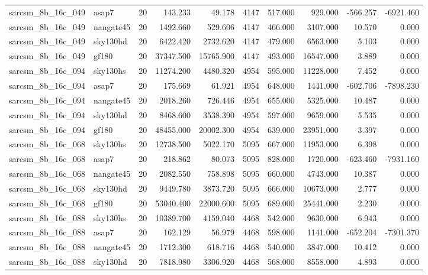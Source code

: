 \begin{tabular}{llrrrrrrrr}
sarcsm\_8b\_16c\_049 & asap7 & 20 & 143.233 & 49.178 & 4147 & 517.000 & 929.000 & -566.257 & -6921.460 \\
sarcsm\_8b\_16c\_049 & nangate45 & 20 & 1492.660 & 529.606 & 4147 & 466.000 & 3107.000 & 10.570 & 0.000 \\
sarcsm\_8b\_16c\_049 & sky130hd & 20 & 6422.420 & 2732.620 & 4147 & 479.000 & 6563.000 & 5.103 & 0.000 \\
sarcsm\_8b\_16c\_049 & gf180 & 20 & 37347.500 & 15765.900 & 4147 & 493.000 & 16547.000 & 3.889 & 0.000 \\
sarcsm\_8b\_16c\_094 & sky130hs & 20 & 11274.200 & 4480.320 & 4954 & 595.000 & 11228.000 & 7.452 & 0.000 \\
sarcsm\_8b\_16c\_094 & asap7 & 20 & 175.669 & 61.921 & 4954 & 648.000 & 1441.000 & -602.706 & -7898.230 \\
sarcsm\_8b\_16c\_094 & nangate45 & 20 & 2018.260 & 726.446 & 4954 & 655.000 & 5325.000 & 10.487 & 0.000 \\
sarcsm\_8b\_16c\_094 & sky130hd & 20 & 8468.600 & 3538.390 & 4954 & 597.000 & 9659.000 & 5.535 & 0.000 \\
sarcsm\_8b\_16c\_094 & gf180 & 20 & 48455.000 & 20002.300 & 4954 & 639.000 & 23951.000 & 3.397 & 0.000 \\
sarcsm\_8b\_16c\_068 & sky130hs & 20 & 12738.500 & 5022.170 & 5095 & 667.000 & 11953.000 & 6.398 & 0.000 \\
sarcsm\_8b\_16c\_068 & asap7 & 20 & 218.862 & 80.073 & 5095 & 828.000 & 1720.000 & -623.460 & -7931.160 \\
sarcsm\_8b\_16c\_068 & nangate45 & 20 & 2082.550 & 758.898 & 5095 & 660.000 & 4743.000 & 10.387 & 0.000 \\
sarcsm\_8b\_16c\_068 & sky130hd & 20 & 9449.780 & 3873.720 & 5095 & 666.000 & 10673.000 & 2.777 & 0.000 \\
sarcsm\_8b\_16c\_068 & gf180 & 20 & 53040.400 & 22000.600 & 5095 & 689.000 & 25441.000 & 2.230 & 0.000 \\
sarcsm\_8b\_16c\_088 & sky130hs & 20 & 10389.700 & 4159.040 & 4468 & 542.000 & 9630.000 & 6.943 & 0.000 \\
sarcsm\_8b\_16c\_088 & asap7 & 20 & 162.129 & 56.979 & 4468 & 598.000 & 1141.000 & -652.204 & -7301.370 \\
sarcsm\_8b\_16c\_088 & nangate45 & 20 & 1712.300 & 618.716 & 4468 & 540.000 & 3847.000 & 10.412 & 0.000 \\
sarcsm\_8b\_16c\_088 & sky130hd & 20 & 7818.980 & 3306.920 & 4468 & 568.000 & 8558.000 & 4.893 & 0.000 \\

\end{tabular}
